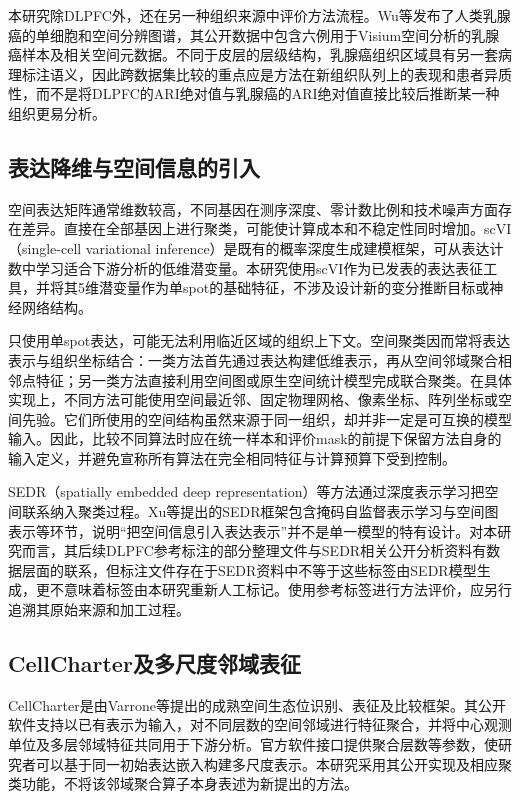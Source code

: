 本研究除DLPFC外，还在另一种组织来源中评价方法流程。Wu等发布了人类乳腺癌的单细胞和空间分辨图谱，其公开数据中包含六例用于Visium空间分析的乳腺癌样本及相关空间元数据\cite{wu2021}。不同于皮层的层级结构，乳腺癌组织区域具有另一套病理标注语义，因此跨数据集比较的重点应是方法在新组织队列上的表现和患者异质性，而不是将DLPFC的ARI绝对值与乳腺癌的ARI绝对值直接比较后推断某一种组织更易分析。

\subsection{表达降维与空间信息的引入}
\label{subsec:cc-expression-v1}

空间表达矩阵通常维数较高，不同基因在测序深度、零计数比例和技术噪声方面存在差异。直接在全部基因上进行聚类，可能使计算成本和不稳定性同时增加。scVI（single-cell variational inference）是既有的概率深度生成建模框架，可从表达计数中学习适合下游分析的低维潜变量\cite{lopez2018}。本研究使用scVI作为已发表的表达表征工具，并将其5维潜变量作为单spot的基础特征，不涉及设计新的变分推断目标或神经网络结构。

只使用单spot表达，可能无法利用临近区域的组织上下文。空间聚类因而常将表达表示与组织坐标结合：一类方法首先通过表达构建低维表示，再从空间邻域聚合相邻点特征；另一类方法直接利用空间图或原生空间统计模型完成联合聚类。在具体实现上，不同方法可能使用空间最近邻、固定物理网格、像素坐标、阵列坐标或空间先验。它们所使用的空间结构虽然来源于同一组织，却并非一定是可互换的模型输入。因此，比较不同算法时应在统一样本和评价mask的前提下保留方法自身的输入定义，并避免宣称所有算法在完全相同特征与计算预算下受到控制。

SEDR（spatially embedded deep representation）等方法通过深度表示学习把空间联系纳入聚类过程。Xu等提出的SEDR框架包含掩码自监督表示学习与空间图表示等环节，说明“把空间信息引入表达表示”并不是单一模型的特有设计\cite{xu2024}。对本研究而言，其后续DLPFC参考标注的部分整理文件与SEDR相关公开分析资料有数据层面的联系，但标注文件存在于SEDR资料中不等于这些标签由SEDR模型生成，更不意味着标签由本研究重新人工标记。使用参考标签进行方法评价，应另行追溯其原始来源和加工过程。

\subsection{CellCharter及多尺度邻域表征}
\label{subsec:cc-cellcharter-v1}

CellCharter是由Varrone等提出的成熟空间生态位识别、表征及比较框架\cite{varrone2024}。其公开软件支持以已有表示为输入，对不同层数的空间邻域进行特征聚合，并将中心观测单位及多层邻域特征共同用于下游分析。官方软件接口提供聚合层数等参数，使研究者可以基于同一初始表达嵌入构建多尺度表示。本研究采用其公开实现及相应聚类功能，不将该邻域聚合算子本身表述为新提出的方法。

